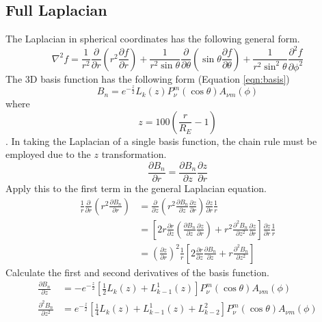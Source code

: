 \documentclass[12pt,letterpaper]{article}
\begin{document}
  \subsection{Full Laplacian}
  The Laplacian in spherical coordinates has the following general form.
  \begin{equation}
    \nabla^2 f = \frac{1}{r^2}\frac{\partial}{\partial r}\left(r^2\frac{\partial f}{\partial r}\right) + \frac{1}{r^2\sin\theta}\frac{\partial}{\partial\theta}\left(\sin\theta\frac{\partial f}{\partial\theta}\right) + \frac{1}{r^2\sin^2\theta}\frac{\partial^2 f}{\partial\phi^2}
  \end{equation}
  The 3D basis function has the following form (Equation \ref{eqn:basis})
  \begin{equation}
    B_n = e^{-\frac{z}{2}}L_k(z)P_\nu^m(\cos\theta)A_{\nu m}(\phi)
  \end{equation}
  where
  \begin{equation}
    z = 100\left(\frac{r}{R_E}-1\right)
  \end{equation}.
  In taking the Laplacian of a single basis function, the chain rule must be employed due to the \(z\) transformation.
  \begin{equation}
    \frac{\partial B_n}{\partial r} = \frac{\partial B_n}{\partial z}\frac{\partial z}{\partial r}
  \end{equation}
  Apply this to the first term in the general Laplacian equation.
  \begin{align}
    \frac{1}{r}\frac{\partial}{\partial r}\left(r^2 \frac{\partial B_n}{\partial r}\right) &= \frac{\partial}{\partial z}\left(r^2 \frac{\partial B_n}{\partial z}\frac{\partial z}{\partial r}\right) \frac{\partial z}{\partial r} \frac{1}{r} \\
    &= \left[2r\frac{\partial r}{\partial z}\left(\frac{\partial B_n}{\partial z}\frac{\partial z}{\partial r}\right) + r^2\frac{\partial^2 B_n}{\partial z^2}\frac{\partial z}{\partial r}\right]\frac{\partial z}{\partial r}\frac{1}{r} \\
    &= \left(\frac{\partial z}{\partial r}\right)^2\frac{1}{r}\left[2\frac{\partial r}{\partial z}\frac{\partial B_n}{\partial z} + r\frac{\partial^2 B_n}{\partial z^2}\right]
  \end{align}
  Calculate the first and second derivatives of the basis function.
  \begin{align}
    \frac{\partial B_n}{\partial z} &= -e^{-\frac{z}{2}}\left[\frac{1}{2}L_k(z)+L_{k-1}^1(z)\right]P_\nu^m(\cos\theta)A_{\nu m}(\phi) \\
    \frac{\partial^2 B_n}{\partial z^2} &= e^{-\frac{z}{2}}\left[\frac{1}{4}L_k(z)+L_{k-1}^1(z)+L_{k-2}^2\right]P_\nu^m(\cos\theta)A_{\nu m}(\phi)
  \end{align}
\end{document}
